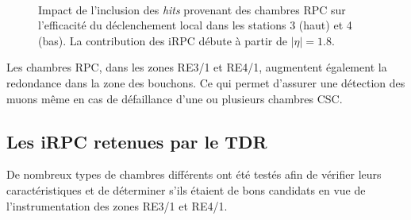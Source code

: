 \begin{itemize}[label=$\bullet$]
	\begin{figure}[ht!]
	 	\centering
	 	\\
	 	\caption{Impact de l'inclusion des \textit{hits} provenant des chambres RPC sur l'efficacité du déclenchement local dans les stations \num{3} (haut) et \num{4} (bas). La contribution des iRPC débute à partir de $|\eta|=\num{1.8}$.}
	 	\label{effii}
	 \end{figure}
	
	Les chambres RPC, dans les zones RE3/1 et RE4/1, augmentent également la redondance dans la zone des bouchons. Ce qui permet d'assurer une détection des muons même en cas de défaillance d'une ou plusieurs chambres CSC.
\end{itemize}

\subsection{Les iRPC retenues par le TDR}
De nombreux types de chambres différents ont été testés afin de vérifier leurs caractéristiques et de déterminer s'ils étaient de bons candidats en vue de l'instrumentation des zones RE3/1 et RE4/1.

